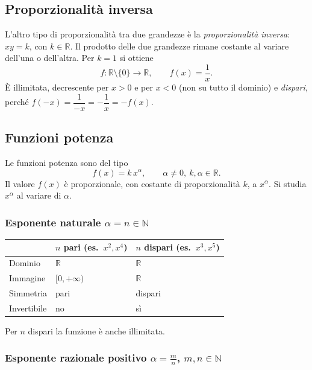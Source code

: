 \documentclass[11pt,a4paper]{article}
\begin{document}
\subsection{Proporzionalità inversa}

L'altro tipo di proporzionalità tra due grandezze è la \emph{proporzionalità inversa}: $xy = k$, con $k \in \mathbb{R}$. Il prodotto delle due grandezze rimane costante al variare dell'una o dell'altra. Per $k = 1$ si ottiene
\[
f : \mathbb{R} \setminus \{0\} \to \mathbb{R}, \qquad f(x) = \frac{1}{x}.
\]
È illimitata, decrescente per $x > 0$ e per $x < 0$ (non su tutto il dominio) e \emph{dispari}, perché $f(-x) = \dfrac{1}{-x} = -\dfrac{1}{x} = -f(x)$.

\subsection{Funzioni potenza}

Le funzioni potenza sono del tipo
\[
f(x) = k\,x^{\alpha}, \qquad \alpha \ne 0,\ k, \alpha \in \mathbb{R}.
\]
Il valore $f(x)$ è proporzionale, con costante di proporzionalità $k$, a $x^\alpha$. Si studia $x^\alpha$ al variare di $\alpha$.

\subsubsection*{Esponente naturale $\alpha = n \in \mathbb{N}$}

\begin{center}
\renewcommand{\arraystretch}{1.3}
\begin{tabular}{@{}lll@{}}
\toprule
 & $n$ pari (es.\ $x^2, x^4$) & $n$ dispari (es.\ $x^3, x^5$) \\
\midrule
Dominio & $\mathbb{R}$ & $\mathbb{R}$ \\
Immagine & $[0,+\infty)$ & $\mathbb{R}$ \\
Simmetria & pari & dispari \\
Invertibile & no & sì \\
\bottomrule
\end{tabular}
\end{center}
Per $n$ dispari la funzione è anche illimitata.

\subsubsection*{Esponente razionale positivo $\alpha = \frac{m}{n}$, $m, n \in \mathbb{N}$}
\end{document}
